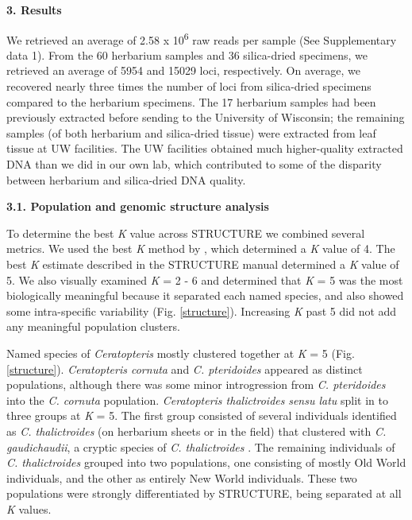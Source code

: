 \documentclass[12pt]{article}
\begin{document}
\begin{flushleft}
\vspace{1cm}

{\large\textbf{3. Results}}

We retrieved an average of 2.58 x 10\textsuperscript{6} raw reads per sample (See Supplementary data 1). From the 60 herbarium samples and 36 silica-dried specimens, we retrieved an average of 5954 and 15029 loci, respectively. On average, we recovered nearly three times the number of loci from silica-dried specimens compared to the herbarium specimens. The 17 herbarium samples had been previously extracted before sending to the University of Wisconsin; the remaining samples (of both herbarium and silica-dried tissue) were extracted from leaf tissue at UW facilities. The UW facilities obtained much higher-quality extracted DNA than we did in our own lab, which contributed to some of the disparity between herbarium and silica-dried DNA quality.

\textbf{3.1. Population and genomic structure analysis}

To determine the best \textit{K} value across {\small{STRUCTURE}} we combined several metrics. We used the best \textit{K} method by \textcite{Evanno2005}, which determined a \textit{K} value of 4. The best \textit{K} estimate described in the {\small{STRUCTURE}} manual \autocite{Pritchard2000} determined a \textit{K} value of 5. We also visually examined \textit{K} = 2 - 6 and determined that \textit{K} = 5 was the most biologically meaningful because it separated each named species, and also showed some intra-specific variability (Fig. \ref{structure}). Increasing \textit{K} past 5 did not add any meaningful population clusters. 

Named species of \textit{Ceratopteris} mostly clustered together at \textit{K} = 5 (Fig. \ref{structure}). \textit{Ceratopteris cornuta} and \textit{C. pteridoides} appeared as distinct populations, although there was some minor introgression from \textit{C. pteridoides} into the \textit{C. cornuta} population. \textit{Ceratopteris thalictroides} \textit{sensu latu} split in to three groups at \textit{K} = 5. The first group consisted of several individuals identified as \textit{C. thalictroides} (on herbarium sheets or in the field) that clustered with \textit{C. gaudichaudii}, a cryptic species of \textit{C. thalictroides} \autocite{Masuyama2010}. The remaining individuals of \textit{C. thalictroides} grouped into two populations, one consisting of mostly Old World individuals, and the other as entirely New World individuals. These two populations were strongly differentiated by {\small{STRUCTURE}}, being separated at all \textit{K} values.


\end{flushleft}
\end{document}
